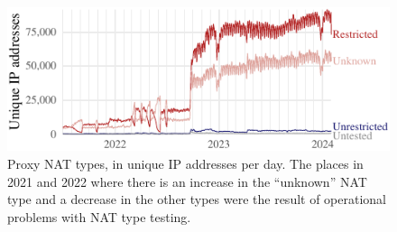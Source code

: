 \documentclass[letterpaper,twocolumn]{article}
\begin{document}
\begin{figure}
\includegraphics{figures/proxies/proxy-nat-type}
\caption{
Proxy NAT types, in unique IP addresses per day.
The places in 2021 and 2022
where there is an increase in the ``unknown'' NAT type
and a decrease in the other types
were the result of operational problems with
NAT type testing.
}
\label{fig:proxy-nat-type}
\end{figure}
\end{document}
